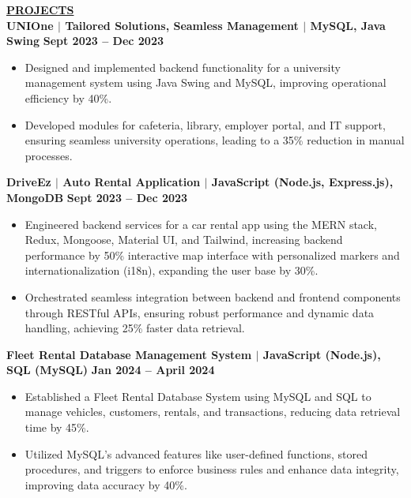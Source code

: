 \documentclass{article}
\begin{document}
\vspace{2mm}


\noindent \textbf{\underline{PROJECTS}} \\
\textbf{\textbf{UNIOne } $\mid$ Tailored Solutions, Seamless Management $\mid$ MySQL, Java Swing  } \hfill {\textbf{\textbf{Sept 2023 – Dec 2023} }}
\begin{itemize}[noitemsep,nolistsep,leftmargin=*]
   \item Designed and implemented backend functionality for a university management system using Java Swing and MySQL, improving operational efficiency by 40\%.
    \item Developed modules for cafeteria, library, employer portal, and IT support, ensuring seamless university operations, leading to a 35\% reduction in manual processes.

\end{itemize}
\textbf{\textbf{DriveEz } $\mid$ Auto Rental Application $\mid$ JavaScript (Node.js, Express.js), MongoDB} \hfill \textbf{\textbf{Sept 2023 – Dec 2023}}
\begin{itemize}[noitemsep,nolistsep,leftmargin=*]
    \item Engineered backend services for a car rental app using the MERN stack, Redux, Mongoose, Material UI, and Tailwind, increasing backend performance by 50\% interactive map interface with personalized markers and internationalization (i18n), expanding the user base by 30\%.
    \item Orchestrated seamless integration between backend and frontend components through RESTful APIs, ensuring robust performance and dynamic data handling, achieving 25\% faster data retrieval.

\end{itemize}
\textbf{\textbf{Fleet Rental Database Management System $\mid$ JavaScript (Node.js), SQL (MySQL)}  } \hfill \textbf{\textbf{Jan 2024 – April 2024} }
\begin{itemize}[noitemsep,nolistsep,leftmargin=*]
   \item Established a Fleet Rental Database System using MySQL and SQL to manage vehicles, customers, rentals, and transactions, reducing data retrieval time by 45\%.
    \item Utilized MySQL's advanced features like user-defined functions, stored procedures, and triggers to enforce business rules and enhance data integrity, improving data accuracy by 40\%.


\end{itemize}
\end{document}
